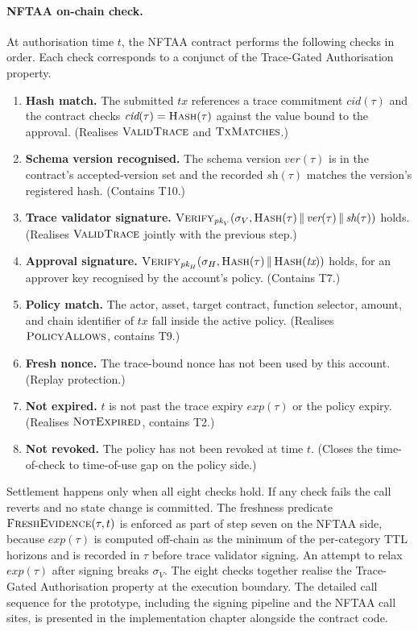\paragraph{NFTAA on-chain check.}
At authorisation time $t$, the NFTAA contract performs the following checks in order. Each check corresponds to a conjunct of the Trace-Gated Authorisation property.
\begin{enumerate}
    \item \textbf{Hash match.} The submitted $\textit{tx}$ references a trace commitment $\textit{cid}(\tau)$ and the contract checks $\textit{cid}(\tau) = \textsc{Hash}(\tau)$ against the value bound to the approval. (Realises $\textsc{ValidTrace}$ and $\textsc{TxMatches}$.)
    \item \textbf{Schema version recognised.} The schema version $\textit{ver}(\tau)$ is in the contract's accepted-version set and the recorded $\textit{sh}(\tau)$ matches the version's registered hash. (Contains T10.)
    \item \textbf{Trace validator signature.} $\textsc{Verify}_{\textit{pk}_V}(\sigma_V, \textsc{Hash}(\tau)\,\|\,\textit{ver}(\tau)\,\|\,\textit{sh}(\tau))$ holds. (Realises $\textsc{ValidTrace}$ jointly with the previous step.)
    \item \textbf{Approval signature.} $\textsc{Verify}_{\textit{pk}_H}(\sigma_H, \textsc{Hash}(\tau)\,\|\,\textsc{Hash}(\textit{tx}))$ holds, for an approver key recognised by the account's policy. (Contains T7.)
    \item \textbf{Policy match.} The actor, asset, target contract, function selector, amount, and chain identifier of $\textit{tx}$ fall inside the active policy. (Realises $\textsc{PolicyAllows}$, contains T9.)
    \item \textbf{Fresh nonce.} The trace-bound nonce has not been used by this account. (Replay protection.)
    \item \textbf{Not expired.} $t$ is not past the trace expiry $\textit{exp}(\tau)$ or the policy expiry. (Realises $\textsc{NotExpired}$, contains T2.)
    \item \textbf{Not revoked.} The policy has not been revoked at time $t$. (Closes the time-of-check to time-of-use gap on the policy side.)
\end{enumerate}
Settlement happens only when all eight checks hold. If any check fails the call reverts and no state change is committed. The freshness predicate $\textsc{FreshEvidence}(\tau, t)$ is enforced as part of step seven on the NFTAA side, because $\textit{exp}(\tau)$ is computed off-chain as the minimum of the per-category TTL horizons and is recorded in $\tau$ before trace validator signing. An attempt to relax $\textit{exp}(\tau)$ after signing breaks $\sigma_V$. The eight checks together realise the Trace-Gated Authorisation property at the execution boundary. The detailed call sequence for the prototype, including the signing pipeline and the NFTAA call sites, is presented in the implementation chapter alongside the contract code.


